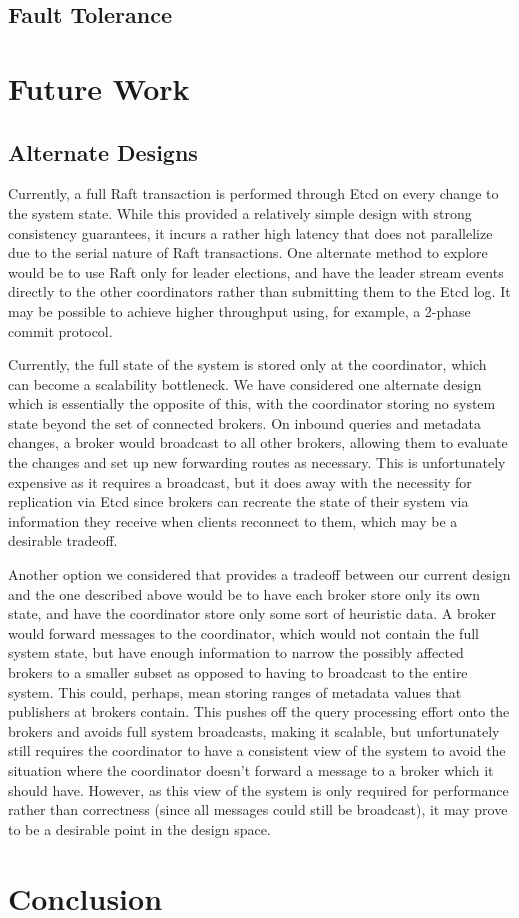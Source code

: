 \documentclass[conference]{IEEEtran}
\begin{document}
\subsection{Fault Tolerance}

\section{Future Work}

\subsection{Alternate Designs}
\label{subsec:alternate_designs}


Currently, a full Raft transaction is performed through Etcd on every change to the system state.
While this provided a relatively simple design with strong consistency guarantees, it incurs a rather high latency that does not parallelize due to the serial nature of Raft transactions.
One alternate method to explore would be to use Raft only for leader elections, and have the leader stream events directly to the other coordinators rather than submitting them to the Etcd log.
It may be possible to achieve higher throughput using, for example, a 2-phase commit protocol. 

Currently, the full state of the system is stored only at the coordinator, which can become a scalability bottleneck.
We have considered one alternate design which is essentially the opposite of this, with the coordinator storing no system state beyond the set of connected brokers. 
On inbound queries and metadata changes, a broker would broadcast to all other brokers, allowing them to evaluate the changes and set up new forwarding routes as necessary.
This is unfortunately expensive as it requires a broadcast, but it does away with the necessity for replication via Etcd since brokers can recreate the state of their system via information they receive when clients reconnect to them, which may be a desirable tradeoff.

Another option we considered that provides a tradeoff between our current design and the one described above would be to have each broker store only its own state, and have the coordinator store only some sort of heuristic data.
A broker would forward messages to the coordinator, which would not contain the full system state, but have enough information to narrow the possibly affected brokers to a smaller subset as opposed to having to broadcast to the entire system.
This could, perhaps, mean storing ranges of metadata values that publishers at brokers contain.
This pushes off the query processing effort onto the brokers and avoids full system broadcasts, making it scalable, but unfortunately still requires the coordinator to have a consistent view of the system to avoid the situation where the coordinator doesn't forward a message to a broker which it should have.
However, as this view of the system is only required for performance rather than correctness (since all messages could still be broadcast), it may prove to be a desirable point in the design space.


\section{Conclusion}



\end{document}
